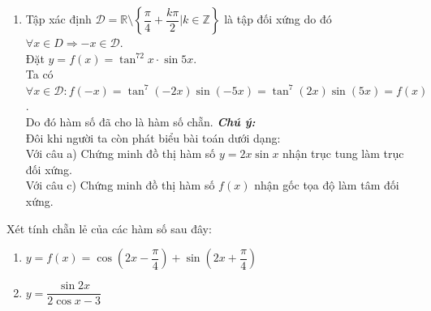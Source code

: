 \begin{ex}
{\begin{enumerate}
			Do đó hàm số đã cho là hàm số lẻ. 
			\item Tập xác định $\mathscr{D}=\mathbb{R}\setminus \left\{\dfrac{\pi}{4}+\dfrac{k\pi}{2}|k\in \mathbb{Z}\right\}$ là tập  đối xứng do đó $\forall x\in D\Rightarrow -x\in \mathscr{D}$.\\
			Đặt $y=f(x)=\tan^72x\cdot  \sin 5x$.\\
			Ta có $\forall x\in \mathscr{D}\colon f(-x)=\tan^7(-2x)\sin (-5x)=\tan^7(2x)\sin  (5x)=f(x)$.\\
			Do đó hàm số đã cho là hàm số  chẵn.
			\textbf{\textit{Chú  ý:}} \\
			Đôi khi người ta còn phát biểu bài toán dưới  dạng:\\
			Với câu a) Chứng minh đồ thị hàm số $y=2x\sin  x$ nhận trục tung làm trục đối xứng.\\
			Với câu  c) Chứng minh đồ thị hàm số $f(x)$ nhận gốc tọa độ làm tâm đối xứng.
		\end{enumerate}
	} 
\end{ex}

\begin{ex}%
	Xét tính chẵn lẻ của  các hàm số sau đây:
	\begin{enumerate}
		 \item $y = f(x) = \cos \left(2x - \dfrac{\pi}{4}\right) + \sin \left(2x + \dfrac{\pi}{4}\right)$
		\item $y = \dfrac{\sin 2x}{2 \cos x - 3}$ 
	\end{enumerate}
\end{ex}

